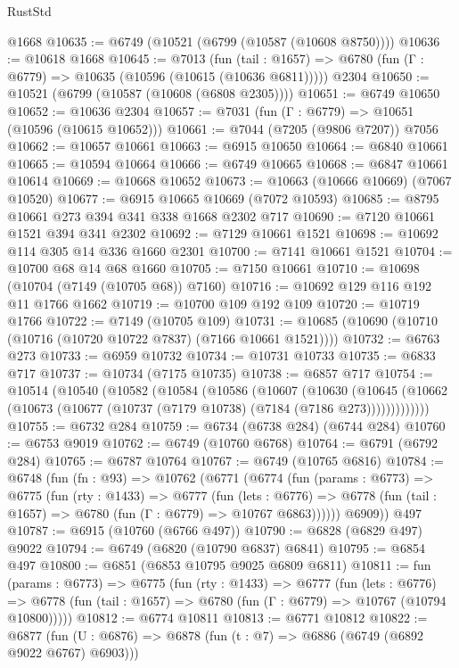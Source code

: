 \begin{lexlean}{RustStd}
\begin{coremodule}
    @1668
@10635 := @6749 (@10521 (@6799 (@10587 (@10608 @8750))))
@10636 := @10618 @1668
@10645 := @7013
    (fun (tail : @1657) => @6780 (fun (Γ : @6779) => @10635 (@10596 (@10615 (@10636 @6811)))))
    @2304
@10650 := @10521 (@6799 (@10587 (@10608 (@6808 @2305))))
@10651 := @6749 @10650
@10652 := @10636 @2304
@10657 := @7031 (fun (Γ : @6779) => @10651 (@10596 (@10615 @10652)))
@10661 := @7044 (@7205 (@9806 @7207)) @7056
@10662 := @10657 @10661
@10663 := @6915 @10650
@10664 := @6840 @10661
@10665 := @10594 @10664
@10666 := @6749 @10665
@10668 := @6847 @10661 @10614
@10669 := @10668 @10652
@10673 := @10663 (@10666 @10669) (@7067 @10520)
@10677 := @6915 @10665 @10669 (@7072 @10593)
@10685 := @8795 @10661 @273 @394 @341 @338 @1668 @2302 @717
@10690 := @7120 @10661 @1521 @394 @341 @2302
@10692 := @7129 @10661 @1521
@10698 := @10692 @114 @305 @14 @336 @1660 @2301
@10700 := @7141 @10661 @1521
@10704 := @10700 @68 @14 @68 @1660
@10705 := @7150 @10661
@10710 := @10698 (@10704 (@7149 (@10705 @68)) @7160)
@10716 := @10692 @129 @116 @192 @11 @1766 @1662
@10719 := @10700 @109 @192 @109
@10720 := @10719 @1766
@10722 := @7149 (@10705 @109)
@10731 := @10685 (@10690 (@10710 (@10716 (@10720 @10722 @7837) (@7166 @10661 @1521))))
@10732 := @6763 @273
@10733 := @6959 @10732
@10734 := @10731 @10733
@10735 := @6833 @717
@10737 := @10734 (@7175 @10735)
@10738 := @6857 @717
@10754 := @10514
    (@10540
      (@10582
        (@10584
          (@10586
            (@10607
              (@10630
                (@10645
                  (@10662 (@10673 (@10677 (@10737 (@7179 @10738) (@7184 (@7186 @273)))))))))))))
@10755 := @6732 @284
@10759 := @6734 (@6738 @284) (@6744 @284)
@10760 := @6753 @9019
@10762 := @6749 (@10760 @6768)
@10764 := @6791 (@6792 @284)
@10765 := @6787 @10764
@10767 := @6749 (@10765 @6816)
@10784 := @6748
    (fun (fn : @93) =>
    @10762
      (@6771
        (@6774
          (fun (params : @6773) =>
          @6775
            (fun (rty : @1433) =>
            @6777
              (fun (lets : @6776) =>
              @6778 (fun (tail : @1657) => @6780 (fun (Γ : @6779) => @10767 @6863))))))
        @6909))
    @497
@10787 := @6915 (@10760 (@6766 @497))
@10790 := @6828 (@6829 @497) @9022
@10794 := @6749 (@6820 (@10790 @6837) @6841)
@10795 := @6854 @497
@10800 := @6851 (@6853 @10795 @9025 @6809 @6811)
@10811 := fun (params : @6773) =>
  @6775
    (fun (rty : @1433) =>
    @6777
      (fun (lets : @6776) =>
      @6778 (fun (tail : @1657) => @6780 (fun (Γ : @6779) => @10767 (@10794 @10800)))))
@10812 := @6774 @10811
@10813 := @6771 @10812
@10822 := @6877 (fun (U : @6876) => @6878 (fun (t : @7) => @6886 (@6749 (@6892 @9022 @6767) @6903)))

\end{coremodule}
\end{lexlean}
